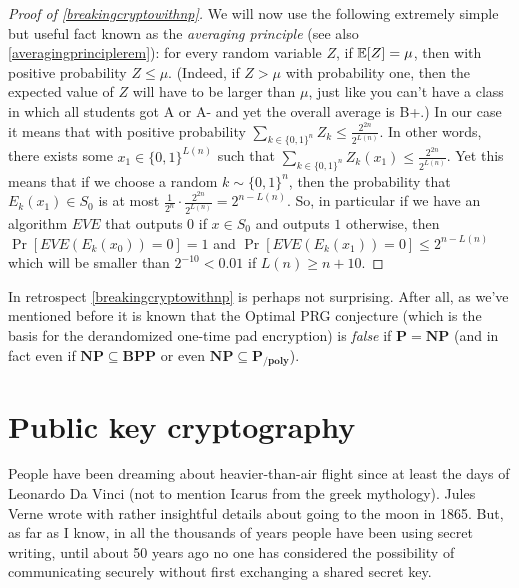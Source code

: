 \begin{proof}[Proof of \cref{breakingcryptowithnp}]
We will now use the following extremely simple but useful fact known as
the \emph{averaging principle} (see also \cref{averagingprinciplerem}):
for every random variable \(Z\), if \(\operatorname*{\mathbb E}[Z]=\mu\), then with positive
probability \(Z \leq \mu\). (Indeed, if \(Z>\mu\) with probability one,
then the expected value of \(Z\) will have to be larger than \(\mu\),
just like you can't have a class in which all students got A or A- and
yet the overall average is B+.) In our case it means that with positive
probability \(\sum_{k\in \{0,1\}^n} Z_k \leq \tfrac{2^{2n}}{2^{L(n)}}\).
In other words, there exists some \(x_1 \in \{0,1\}^{L(n)}\) such that
\(\sum_{k\in \{0,1\}^n} Z_k(x_1) \leq \tfrac{2^{2n}}{2^{L(n)}}\). Yet
this means that if we choose a random \(k \sim \{0,1\}^n\), then the
probability that \(E_k(x_1) \in S_0\) is at most
\(\tfrac{1}{2^n} \cdot \tfrac{2^{2n}}{2^{L(n)}} = 2^{n-L(n)}\). So, in
particular if we have an algorithm \(\ensuremath{\mathit{EVE}}\) that
outputs \(0\) if \(x\in S_0\) and outputs \(1\) otherwise, then
\(\Pr[ \ensuremath{\mathit{EVE}}(E_k(x_0))=0]=1\) and
\(\Pr[\ensuremath{\mathit{EVE}}(E_k(x_1))=0] \leq 2^{n-L(n)}\) which
will be smaller than \(2^{-10} < 0.01\) if \(L(n) \geq n+10\).

\end{proof}

In retrospect \cref{breakingcryptowithnp} is perhaps not surprising.
After all, as we've mentioned before it is known that the Optimal PRG
conjecture (which is the basis for the derandomized one-time pad
encryption) is \emph{false} if \(\mathbf{P}=\mathbf{NP}\) (and in fact
even if \(\mathbf{NP}\subseteq \mathbf{BPP}\) or even
\(\mathbf{NP} \subseteq \mathbf{P_{/poly}}\)).

\section{Public key cryptography}\label{Public-key-cryptography}

People have been dreaming about heavier-than-air flight since at least
the days of Leonardo Da Vinci (not to mention Icarus from the greek
mythology). Jules Verne wrote with rather insightful details about going
to the moon in 1865. But, as far as I know, in all the thousands of
years people have been using secret writing, until about 50 years ago no
one has considered the possibility of communicating securely without
first exchanging a shared secret key.


